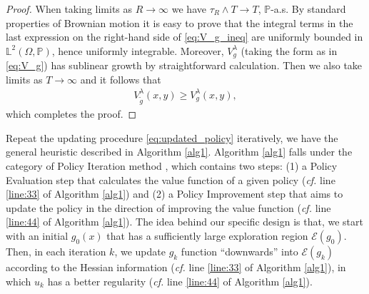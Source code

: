 \documentclass[11pt]{amsart}
\newcommand{\jo}[1]{{\textcolor{blue}{#1}}}
\theoremstyle{plain}
\def \R{\mathbb{R}}
\numberwithin{equation}{section}
\begin{document}
\begin{proof}
When taking limits as $R \rightarrow\infty$ we have $\tau_R\wedge T\rightarrow T$, $\mathbb{P}$-a.s.  By standard properties of Brownian motion it is easy to prove that the integral terms in the last expression on the right-hand side of \eqref{eq:V_g_ineq} are uniformly bounded in $\mathbb{L}^2(\Omega, \mathbb{P})$, hence uniformly integrable. Moreover,
$V^\lambda_g$ (taking the form as in \eqref{eq:V_g}) has sublinear growth by straightforward calculation. Then we also take limits as $T\rightarrow \infty$ and it follows
that
\begin{eqnarray*}
    V^\lambda_{\widetilde{g}}(x,y) \ge V^\lambda_{g}(x,y),
\end{eqnarray*}
which completes the proof. 
\end{proof}




Repeat the updating procedure \eqref{eq:updated_policy} iteratively, we have the general heuristic described in Algorithm \ref{alg1}. Algorithm \ref{alg1} falls under the category of Policy Iteration method \cite{sutton2018reinforcement,thomas2016data}, which contains two steps: (1) a Policy Evaluation step that calculates the value function of a given policy ({\it cf.} line \ref{line:33} of Algorithm \ref{alg1}) and (2) a Policy Improvement step that aims to update the policy in the direction of improving the value function ({\it cf.} line \ref{line:44} of Algorithm \ref{alg1}).
The idea behind our specific design is that, we start with an initial $g_0(x)$ that has a sufficiently large exploration region $\mathcal{E}(g_0)$. Then, in each iteration $k$, we update  $g_k$ function  ``downwards'' into $\mathcal{E}(g_k)$ according to the Hessian information ({\it cf.} line \ref{line:33} of Algorithm \ref{alg1}), in which $u_k$ has a better regularity ({\it cf.} line \ref{line:44} of Algorithm \ref{alg1}). 
\end{document}
